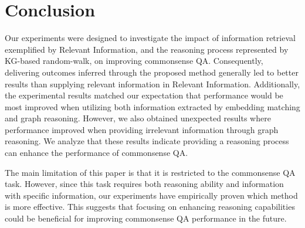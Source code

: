 \documentclass{article}
\begin{document}

 



\section{Conclusion}
Our experiments were designed to investigate the impact of information retrieval exemplified by Relevant Information, and the reasoning process represented by KG-based random-walk, on improving commonsense QA. Consequently, delivering outcomes inferred through the proposed method generally led to better results than supplying relevant information in Relevant Information. Additionally, the experimental results matched our expectation that performance would be most improved when utilizing both information extracted by embedding matching and graph reasoning. However, we also obtained unexpected results where performance improved when providing irrelevant information through graph reasoning. We analyze that these results indicate providing a reasoning process can enhance the performance of commonsense QA.

The main limitation of this paper is that it is restricted to the commonsense QA task. However, since this task requires both reasoning ability and information with specific information, our experiments have empirically proven which method is more effective. This suggests that focusing on enhancing reasoning capabilities could be beneficial for improving commonsense QA performance in the future.




\end{document}
